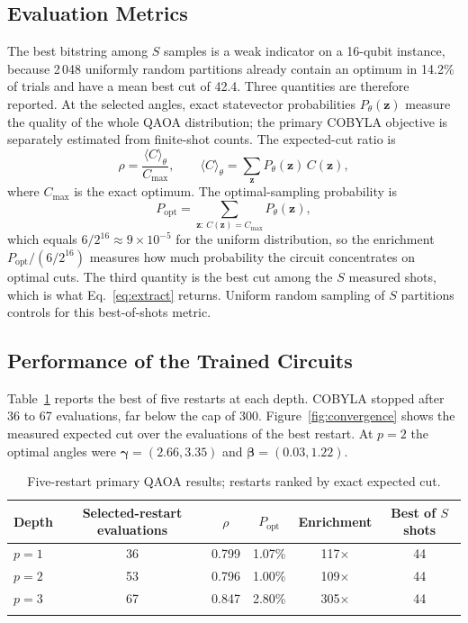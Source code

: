 \documentclass[pdflatex,sn-mathphys-num]{sn-jnl}
\theoremstyle{thmstyleone}
\theoremstyle{thmstyletwo}
\theoremstyle{thmstylethree}
\begin{document}
\subsection{Evaluation Metrics}\label{sec:metrics}

The best bitstring among $S$ samples is a weak indicator on a 16-qubit instance, because 2\,048 uniformly random partitions already contain an optimum in 14.2\% of trials and have a mean best cut of 42.4. Three quantities are therefore reported. At the selected angles, exact statevector probabilities $P_{\theta}(\mathbf{z})$ measure the quality of the whole QAOA distribution; the primary COBYLA objective is separately estimated from finite-shot counts. The expected-cut ratio is
\begin{equation}
  \rho = \frac{\langle C\rangle_{\theta}}{C_{\max}}, \qquad \langle C\rangle_{\theta}=\sum_{\mathbf{z}}P_{\theta}(\mathbf{z})\,C(\mathbf{z}),
  \label{eq:rho}
\end{equation}
where $C_{\max}$ is the exact optimum. The optimal-sampling probability is
\begin{equation}
  P_{\mathrm{opt}} = \sum_{\mathbf{z}:\,C(\mathbf{z})=C_{\max}}P_{\theta}(\mathbf{z}),
  \label{eq:popt}
\end{equation}
which equals $6/2^{16}\approx9\times10^{-5}$ for the uniform distribution, so the enrichment $P_{\mathrm{opt}}/(6/2^{16})$ measures how much probability the circuit concentrates on optimal cuts. The third quantity is the best cut among the $S$ measured shots, which is what Eq.~\eqref{eq:extract} returns. Uniform random sampling of $S$ partitions controls for this best-of-shots metric.

\subsection{Performance of the Trained Circuits}\label{sec:training}

Table~\ref{tab:training} reports the best of five restarts at each depth. COBYLA stopped after 36 to 67 evaluations, far below the cap of 300. Figure~\ref{fig:convergence} shows the measured expected cut over the evaluations of the best restart. At $p=2$ the optimal angles were $\boldsymbol{\gamma}=(2.66,3.35)$ and $\boldsymbol{\beta}=(0.03,1.22)$.

\begin{table}[h]
\caption{Five-restart primary QAOA results; restarts ranked by exact expected cut.}\label{tab:training}
\begin{tabular}{@{}lccccc@{}}
\toprule
Depth & Selected-restart evaluations & $\rho$ & $P_{\mathrm{opt}}$ & Enrichment & Best of $S$ shots \\
\midrule
$p=1$ & 36 & 0.799 & 1.07\% & 117$\times$ & 44 \\
$p=2$ & 53 & 0.796 & 1.00\% & 109$\times$ & 44 \\
$p=3$ & 67 & 0.847 & 2.80\% & 305$\times$ & 44 \\
\botrule
\end{tabular}
\end{table}
\end{document}
